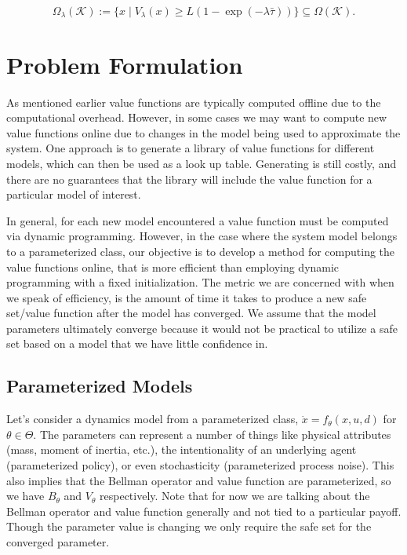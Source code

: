 \documentclass{journal}
\newcommand{\K}{\mathcal{K}}
\begin{document}
\begin{equation} \label{eq:safe_set_lambda}
\Omega_{\lambda}(\K) := \{x \mid V_{\lambda}(x) \ge L( 1 -  \exp(-\lambda \bar{\tau})) \} \subseteq \Omega(\K).
\end{equation}  

\section{Problem Formulation}
As mentioned earlier value functions are typically computed offline due to the computational overhead. However, in some cases we may want to compute new value functions online due to changes in the model being used to approximate the system. One approach is to generate a library of value functions for different models, which can then be used as a look up table. Generating is still costly, and there are no guarantees that the library will include the value function for a particular model of interest.

In general, for each new model encountered  a value function must be computed via dynamic programming. However, in the case where the system model belongs to a parameterized class, our objective is to develop a method for computing the value functions online, that is more efficient than employing dynamic programming with a fixed initialization. The metric we are concerned with when we speak of efficiency, is the amount of time it takes to produce a new safe set/value function after the model has converged. We assume that the model parameters ultimately converge because it would not be practical to utilize a safe set based on a model that we have little confidence in.

\subsection{Parameterized Models}
Let's consider a dynamics model from a  parameterized class, $\dot{x}=f_{\theta}(x,u,d)$ for $\theta \in \Theta$. The parameters can represent a number of things like physical attributes (mass, moment of inertia, etc.), the intentionality of an underlying agent (parameterized policy), or even stochasticity (parameterized process noise). This also implies that the Bellman operator and value function are parameterized, so we have $B_\theta$ and $V_\theta$ respectively. Note that for now we are talking about the Bellman operator and value function generally and not tied to a particular payoff. Though the parameter value is changing we only require the safe set for the converged parameter.
\end{document}
